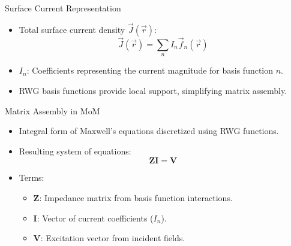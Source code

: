 \begin{frame}{Surface Current Representation}
    \begin{itemize}
        \item Total surface current density \(\vec{J}(\vec{r})\):
\begin{equation}
\vec{J}(\vec{r}) = \sum_n I_n \vec{f}_n(\vec{r})
\end{equation}
        \item \(I_n\): Coefficients representing the current magnitude for basis function \(n\).
        \item RWG basis functions provide local support, simplifying matrix assembly.
    \end{itemize}
\end{frame}

\begin{frame}{Matrix Assembly in MoM}
    \begin{itemize}
        \item Integral form of Maxwell's equations discretized using RWG functions.
        \item Resulting system of equations:
            \begin{equation}
            \mathbf{Z} \mathbf{I} = \mathbf{V}
            \end{equation}
        \item Terms:
            \begin{itemize}
                \item \(\mathbf{Z}\): Impedance matrix from basis function interactions.
                \item \(\mathbf{I}\): Vector of current coefficients (\(I_n\)).
                \item \(\mathbf{V}\): Excitation vector from incident fields.
            \end{itemize}
    \end{itemize}
\end{frame}

